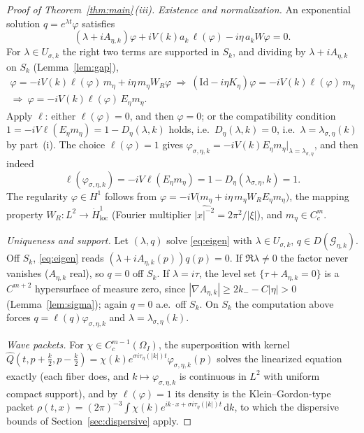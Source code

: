 \documentclass[11pt,a4paper]{amsart}
\theoremstyle{definition}
\theoremstyle{remark}
\newcommand{\Id}{\mathrm{Id}}
\newcommand{\dd}{\,\mathrm{d}}
\newcommand{\ellf}{\ell}
\newcommand{\sG}{\mathcal{G}}
\begin{document}
\begin{proof}[Proof of Theorem~\ref{thm:main}\,(iii)]
\emph{Existence and normalization.} An exponential solution $q=e^{\lambda t}\varphi$ satisfies
\begin{equation}\label{eq:eigen}
(\lambda+iA_{\eta,k})\varphi+iV(k)a_k\,\ellf(\varphi)-i\eta\,a_kW\varphi=0 .
\end{equation}
For $\lambda\in U_{\sigma,k}$ the right two terms are supported in $S_k$, and dividing by $\lambda+iA_{\eta,k}$ on $S_k$ (Lemma~\ref{lem:gap}),
\begin{gather*}
\varphi=-iV(k)\ellf(\varphi)\,m_\eta+i\eta\,m_\eta W_R\varphi
\ \Longrightarrow\
(\Id-i\eta K_\eta)\varphi=-iV(k)\ellf(\varphi)\,m_\eta\\
\Longrightarrow\
\varphi=-iV(k)\ellf(\varphi)\,E_\eta m_\eta .
\end{gather*}
Apply $\ellf$: either $\ellf(\varphi)=0$, and then $\varphi=0$; or the compatibility condition $1=-iV\ellf(E_\eta m_\eta)=1-D_\eta(\lambda,k)$ holds, i.e.\ $D_\eta(\lambda,k)=0$, i.e.\ $\lambda=\lambda_{\sigma,\eta}(k)$ by part~(i). The choice $\ellf(\varphi)=1$ gives $\varphi_{\sigma,\eta,k}=-iV(k)E_\eta m_\eta|_{\lambda=\lambda_{\sigma,\eta}}$, and then indeed
\[
\ellf(\varphi_{\sigma,\eta,k})=-iV\ellf(E_\eta m_\eta)=1-D_\eta(\lambda_{\sigma,\eta},k)=1 .
\]
The regularity $\varphi\in H^1$ follows from $\varphi=-iV\bigl(m_\eta+i\eta\,m_\eta W_R E_\eta m_\eta\bigr)$, the mapping property $W_R:L^2\to\dot H^1_{\mathrm{loc}}$ (Fourier multiplier $\widehat{|x|^{-2}}=2\pi^2/|\xi|$), and $m_\eta\in C^m_c$.

\emph{Uniqueness and support.} Let $(\lambda,q)$ solve \eqref{eq:eigen} with $\lambda\in U_{\sigma,k}$, $q\in D(\sG_{\eta,k})$. Off $S_k$, \eqref{eq:eigen} reads $(\lambda+iA_{\eta,k}(p))q(p)=0$. If $\Re\lambda\ne0$ the factor never vanishes ($A_{\eta,k}$ real), so $q=0$ off $S_k$. If $\lambda=i\tau$, the level set $\{\tau+A_{\eta,k}=0\}$ is a $C^{m+2}$ hypersurface of measure zero, since $|\nabla A_{\eta,k}|\ge2k_--C|\eta|>0$ (Lemma~\ref{lem:sigma}); again $q=0$ a.e.\ off $S_k$. On $S_k$ the computation above forces $q=\ellf(q)\varphi_{\sigma,\eta,k}$ and $\lambda=\lambda_{\sigma,\eta}(k)$.

\emph{Wave packets.} For $\chi\in C_c^{m-1}(\Omega_I)$, the superposition with kernel
$\widehat Q(t,p+\frac k2,p-\frac k2)=\chi(k)e^{\sigma i\tau_\eta(|k|)t}\varphi_{\sigma,\eta,k}(p)$
solves the linearized equation exactly (each fiber does, and $k\mapsto\varphi_{\sigma,\eta,k}$ is continuous in $L^2$ with uniform compact support), and by $\ellf(\varphi)=1$ its density is the Klein--Gordon-type packet
$\rho(t,x)=(2\pi)^{-3}\int\chi(k)e^{ik\cdot x+\sigma i\tau_\eta(|k|)t}\dd k$,
to which the dispersive bounds of Section~\ref{sec:dispersive} apply.
\end{proof}
\end{document}
